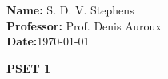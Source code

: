 \documentclass{report}
\begin{document}
\begin{titlebox}[Math 55a]
    \textbf{Name:} S. D. V. Stephens\\[2mm]
    \textbf{Professor:} Prof. Denis Auroux\\[2mm]
    \textbf{Date:}\today 
\tcblower
    \begin{center}
    \vspace{4mm}
    {\Huge\bfseries PSET 1}
    \end{center}
\end{titlebox}
\vspace{10mm}

\qs{}{}
\sol 

\qs{}{}
\sol 

\qs{}{}
\sol
\end{document}
